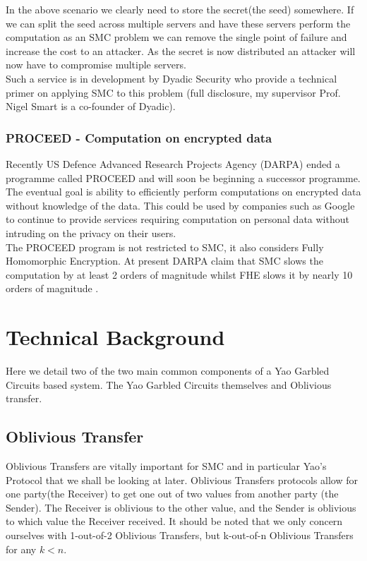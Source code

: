\documentclass[ %
                    author={Nicholas Tutte},
                supervisor={Prof. Nigel Smart},
                    degree={MEng},
                     title={Secure Two Party Computation},
                  subtitle={A practical comparison of recent protocols},
                      type={Research - GG1K},
                      year={2015} ]{dissertation}
\begin{document}
				In the above scenario we clearly need to store the secret(the seed) somewhere. If we can split the seed across multiple servers and have these servers perform the computation as an SMC problem we can remove the single point of failure and increase the cost to an attacker. As the secret is now distributed an attacker will now have to compromise multiple servers.\\

				Such a service is in development by Dyadic Security who provide a technical primer on applying SMC to this problem \cite{DYADIC_MPC_Primer} (full disclosure, my supervisor Prof. Nigel Smart is a co-founder of Dyadic).

			\subsection{PROCEED - Computation on encrypted data} \label{sub2:PROCEED_DARPA}
				Recently US Defence Advanced Research Projects Agency (DARPA) ended a programme called PROCEED and will soon be beginning a successor programme. The eventual goal is ability to efficiently perform computations on encrypted data without knowledge of the data. This could be used by companies such as Google to continue to provide services requiring computation on personal data without intruding on the privacy on their users.\\

				The PROCEED program is not restricted to SMC, it also considers Fully Homomorphic Encryption. At present DARPA claim that SMC slows the computation by at least 2 orders of magnitude whilst FHE slows it by nearly 10 orders of magnitude \cite{DARPAPROceed}. 


	\chapter{Technical Background}
		Here we detail two of the two main common components of a Yao Garbled Circuits based system. The Yao Garbled Circuits themselves and Oblivious transfer.

		\section{Oblivious Transfer} \label{sec:OT_Intro}
			Oblivious Transfers are vitally important for SMC and in particular Yao's Protocol that we shall be looking at later. Oblivious Transfers protocols allow for one party(the Receiver) to get one out of two values from another party (the Sender). The Receiver is oblivious to the other value, and the Sender is oblivious to which value the Receiver received. It should be noted that we only concern ourselves with 1-out-of-2 Oblivious Transfers, but k-out-of-n Oblivious Transfers for any $k < n$.\\
\end{document}
